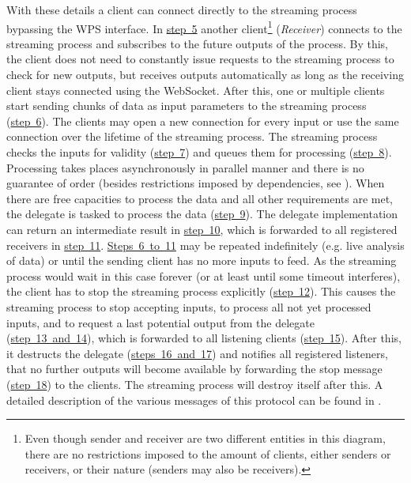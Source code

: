 		With these details a client can connect directly to the streaming process bypassing the \ac{WPS} interface. In \hyperref[fig:sd:swps]{step~5} another client\footnote{Even though sender and receiver are two different entities in this diagram, there are no restrictions imposed to the amount of clients, either senders or receivers, or their nature (senders may also be receivers).} (\emph{Receiver}) connects to the streaming process and subscribes to the future outputs of the process. By this, the client does not need to constantly issue requests to the streaming process to check for new outputs, but receives outputs automatically as long as the receiving client stays connected using the WebSocket.
		After this, one or multiple clients start sending chunks of data as input parameters to the streaming process (\hyperref[fig:sd:swps]{step~6}). The clients may open a new connection for every input or use the same connection over the lifetime of the streaming process. The streaming process checks the inputs for validity (\hyperref[fig:sd:swps]{step~7}) and queues them for processing (\hyperref[fig:sd:swps]{step~8}).
		Processing takes places asynchronously in parallel manner and there is no guarantee of order (besides restrictions imposed by dependencies, see ). When there are free capacities to process the data and all other requirements are met, the delegate is tasked to process the data (\hyperref[fig:sd:swps]{step~9}). The delegate implementation can return an intermediate result in \hyperref[fig:sd:swps]{step~10}, which is forwarded to all registered receivers in \hyperref[fig:sd:swps]{step~11}.
		\hyperref[fig:sd:swps]{Steps~6~to~11} may be repeated indefinitely (e.g. live analysis of data) or until the sending client has no more inputs to feed. As the streaming process would wait in this case forever (or at least until some timeout interferes), the client has to stop the streaming process explicitly (\hyperref[fig:sd:swps]{step~12}).
		This causes the streaming process to stop accepting inputs, to process all not yet processed inputs, and to request a last potential output from the delegate (\hyperref[fig:sd:swps]{step~13~and~14}), which is forwarded to all listening clients (\hyperref[fig:sd:swps]{step~15}). After this, it destructs the delegate (\hyperref[fig:sd:swps]{steps~16~and~17}) and notifies all registered listeners, that no further outputs will become available by forwarding the stop message (\hyperref[fig:sd:swps]{step~18}) to the clients. The streaming process will destroy itself after this. A detailed description of the various messages of this protocol can be found in .

